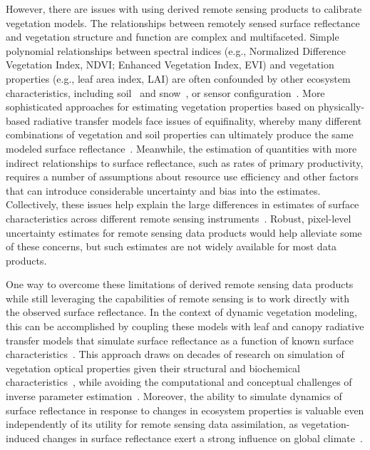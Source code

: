 However, there are issues with using derived remote sensing products to calibrate vegetation models.
The relationships between remotely sensed surface reflectance and vegetation structure and function are complex and multifaceted.
Simple polynomial relationships between spectral indices (e.g., Normalized Difference Vegetation Index, NDVI; Enhanced Vegetation Index, EVI) and vegetation properties (e.g., leaf area index, LAI) are often confounded by other ecosystem characteristics, including soil~\parencite{myneni1994relationship} and snow~\parencite{zhang2020evaluating}, or sensor configuration~\parencite{fensholt2004evaluation}.
More sophisticated approaches for estimating vegetation properties based on physically-based radiative transfer models face issues of equifinality, whereby many different combinations of vegetation and soil properties can ultimately produce the same modeled surface reflectance~\parencite{combal2003retrieval, lewis2007spectral}.
Meanwhile, the estimation of quantities with more indirect relationships to surface reflectance, such as rates of primary productivity, requires a number of assumptions about resource use efficiency and other factors~\parencite{running2004continuous} that can introduce considerable uncertainty and bias into the estimates.
Collectively, these issues help explain the large differences in estimates of surface characteristics across different remote sensing instruments~\parencite{liu_2018_satellite}.
Robust, pixel-level uncertainty estimates for remote sensing data products would help alleviate some of these concerns, but such estimates are not widely available for most data products.

One way to overcome these limitations of derived remote sensing data products while still leveraging the capabilities of remote sensing is to work directly with the observed surface reflectance.
In the context of dynamic vegetation modeling, this can be accomplished by coupling these models with leaf and canopy radiative transfer models that simulate surface reflectance as a function of known surface characteristics~\parencite{knorr2001assimilation, nouvellon2001coupling, quaife2008assimilating}.
This approach draws on decades of research on simulation of vegetation optical properties given their structural and biochemical characteristics~\parencite{dickinson_1983_land, sellers1985canopy, verhoef1984light, lewis2007spectral, jacquemoud2009prospect, pinty2004synergy, widlowski2007third, widlowski2015fourth, hogan_2018_fast}, while avoiding the computational and conceptual challenges of inverse parameter estimation~\parencite{combal2003retrieval, lewis2007spectral}.
Moreover, the ability to simulate dynamics of surface reflectance in response to changes in ecosystem properties is valuable even independently of its utility for remote sensing data assimilation, as vegetation-induced changes in surface reflectance exert a strong influence on global climate~\parencite{bonan2008forests, swann2010changes, swann2012midlatitude}.

